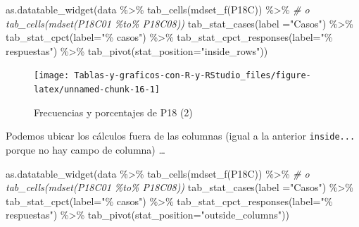 \documentclass[
]{book}
\newenvironment{Shaded}{\begin{snugshade}}{\end{snugshade}}
\newcommand{\AttributeTok}[1]{\textcolor[rgb]{0.77,0.63,0.00}{#1}}
\newcommand{\CommentTok}[1]{\textcolor[rgb]{0.56,0.35,0.01}{\textit{#1}}}
\newcommand{\FunctionTok}[1]{\textcolor[rgb]{0.00,0.00,0.00}{#1}}
\newcommand{\NormalTok}[1]{#1}
\newcommand{\SpecialCharTok}[1]{\textcolor[rgb]{0.00,0.00,0.00}{#1}}
\newcommand{\StringTok}[1]{\textcolor[rgb]{0.31,0.60,0.02}{#1}}
\begin{document}
\begin{Shaded}
\begin{Highlighting}[]
\FunctionTok{as.datatable\_widget}\NormalTok{(data }\SpecialCharTok{\%\textgreater{}\%} 
  \FunctionTok{tab\_cells}\NormalTok{(}\FunctionTok{mdset\_f}\NormalTok{(P18C)) }\SpecialCharTok{\%\textgreater{}\%}  \CommentTok{\# o tab\_cells(mdset(P18C01 \%to\% P18C08))}
  \FunctionTok{tab\_stat\_cases}\NormalTok{(}\AttributeTok{label =}\StringTok{"Casos"}\NormalTok{) }\SpecialCharTok{\%\textgreater{}\%} 
  \FunctionTok{tab\_stat\_cpct}\NormalTok{(}\AttributeTok{label=}\StringTok{"\% casos"}\NormalTok{) }\SpecialCharTok{\%\textgreater{}\%} 
  \FunctionTok{tab\_stat\_cpct\_responses}\NormalTok{(}\AttributeTok{label=}\StringTok{"\% respuestas"}\NormalTok{) }\SpecialCharTok{\%\textgreater{}\%} 
  \FunctionTok{tab\_pivot}\NormalTok{(}\AttributeTok{stat\_position=}\StringTok{"inside\_rows"}\NormalTok{))}
\end{Highlighting}
\end{Shaded}

\begin{figure}[H]

{\centering \texttt{[image: Tablas-y-graficos-con-R-y-RStudio\_files/figure-latex/unnamed-chunk-16-1]} 

}

\caption{Frecuencias y porcentajes de P18 (2)}\label{fig:unnamed-chunk-16}
\end{figure}

Podemos ubicar los cálculos fuera de las columnas (igual a la anterior \texttt{inside...} porque no hay campo de columna) \ldots{}

\begin{Shaded}
\begin{Highlighting}[]
\FunctionTok{as.datatable\_widget}\NormalTok{(data }\SpecialCharTok{\%\textgreater{}\%} 
  \FunctionTok{tab\_cells}\NormalTok{(}\FunctionTok{mdset\_f}\NormalTok{(P18C)) }\SpecialCharTok{\%\textgreater{}\%}  \CommentTok{\# o tab\_cells(mdset(P18C01 \%to\% P18C08))}
  \FunctionTok{tab\_stat\_cases}\NormalTok{(}\AttributeTok{label =}\StringTok{"Casos"}\NormalTok{) }\SpecialCharTok{\%\textgreater{}\%} 
  \FunctionTok{tab\_stat\_cpct}\NormalTok{(}\AttributeTok{label=}\StringTok{"\% casos"}\NormalTok{) }\SpecialCharTok{\%\textgreater{}\%} 
  \FunctionTok{tab\_stat\_cpct\_responses}\NormalTok{(}\AttributeTok{label=}\StringTok{"\% respuestas"}\NormalTok{) }\SpecialCharTok{\%\textgreater{}\%} 
  \FunctionTok{tab\_pivot}\NormalTok{(}\AttributeTok{stat\_position=}\StringTok{"outside\_columns"}\NormalTok{))}
\end{Highlighting}
\end{Shaded}
\end{document}
